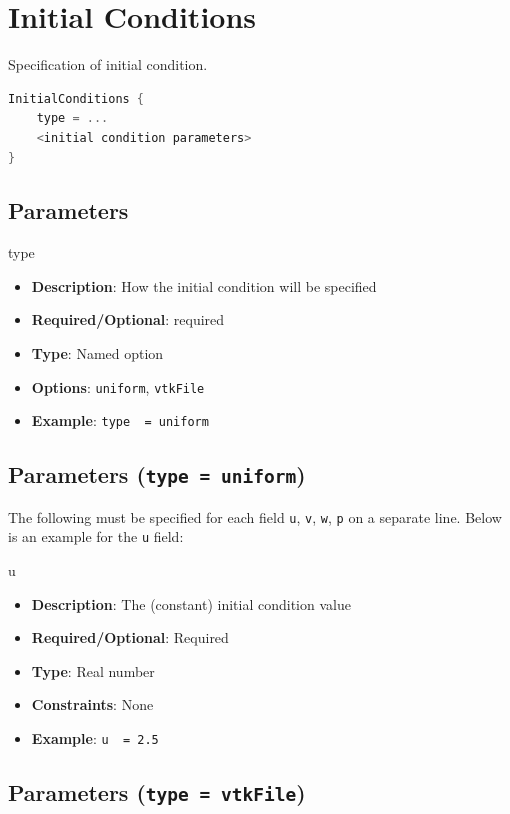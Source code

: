\section{Initial Conditions}
Specification of initial condition.

\begin{lstlisting}[language=C++]
InitialConditions {
    type = ...
    <initial condition parameters>
}
\end{lstlisting}

\subsection*{Parameters}

type
\vspace{\the\parameterListSpacing}
\begin{itemize}
    \item {\bf Description}: How the initial condition will be specified
    \item {\bf Required/Optional}: required
    \item {\bf Type}: Named option
    \item {\bf Options}: \lstinline!uniform!, \lstinline!vtkFile!
    \item {\bf Example}: \lstinline!type  = uniform!
\end{itemize}


\subsection*{Parameters (\lstinline!type = uniform!) }
The following must be specified for each field \lstinline!u!, \lstinline!v!, \lstinline!w!, \lstinline!p! on a separate line. Below is an example for the \lstinline!u! field:

u
\vspace{\the\parameterListSpacing}
\begin{itemize}
    \item {\bf Description}: The (constant) initial condition value
    \item {\bf Required/Optional}: Required
    \item {\bf Type}: Real number
    \item {\bf Constraints}: None
    \item {\bf Example}: \lstinline!u  = 2.5!
\end{itemize}

\subsection*{Parameters (\lstinline!type = vtkFile!)}

